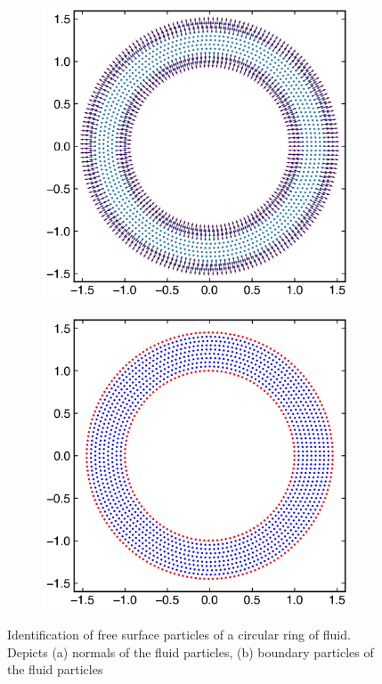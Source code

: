 \begin{figure}
  \centering
  \begin{subfigure}{0.48\textwidth}
    \centering
    \includegraphics[width=1\linewidth]{figures/ctvf/figures/free_surface_identification_demonstration/circle_geometry_normals}
    \subcaption{}%
    \label{fig:free_surface_circle_normals}
  \end{subfigure}
  \begin{subfigure}{0.48\textwidth}
    \centering
    \includegraphics[width=1\linewidth]{figures/ctvf/figures/free_surface_identification_demonstration/circle_geometry}
    \subcaption{}%
    \label{fig:free_surface_circle_boundary_particles}
  \end{subfigure}
  \caption{Identification of free surface particles of a circular ring of
    fluid. Depicts (a) normals of the fluid particles, (b) boundary particles
    of the fluid particles}
\label{fig:boundary-particles-circle}
\end{figure}
